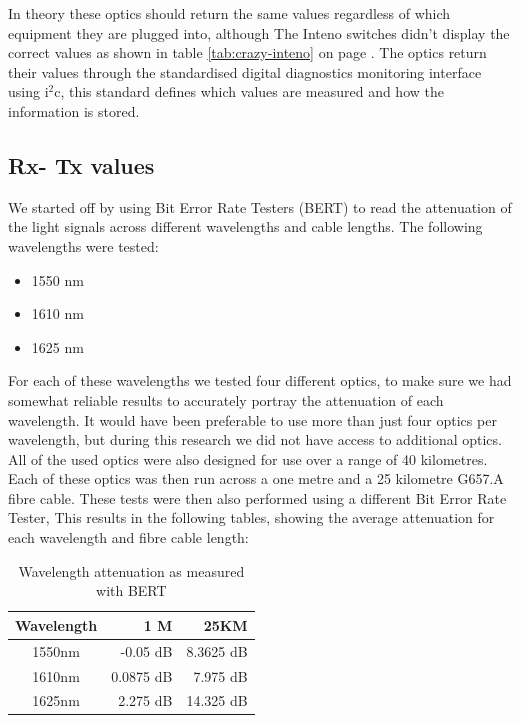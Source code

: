 \documentclass{article}
\begin{document}
In theory these optics should return the same values regardless of which equipment they are plugged into, although The Inteno switches didn't display the correct values as shown in table \ref{tab:crazy-inteno} on page \pageref{tab:crazy-inteno}.
The optics return their values through the standardised digital diagnostics monitoring interface using i$^2$c, this standard defines which values are measured and how the information is stored.\cite{SFF:DDM}


\subsection{Rx- Tx values}
We started off by using Bit Error Rate Testers (BERT) to read the attenuation of the light signals across different wavelengths and cable lengths.
The following wavelengths were tested:
\begin{itemize}
	\item 1550 nm
	\item 1610 nm
	\item 1625 nm
\end{itemize}

For each of these wavelengths we tested four different optics, to make sure we had somewhat reliable results to accurately portray the attenuation of each wavelength.
It would have been preferable to use more than just four optics per wavelength, but during this research we did not have access to additional optics.
All of the used optics were also designed for use over a range of 40 kilometres.
Each of these optics was then run across a one metre and a 25 kilometre G657.A fibre cable.
These tests were then also performed using a different Bit Error Rate Tester, 
This results in the following tables, showing the average attenuation for each wavelength and fibre cable length:

\begin{table}[h]
\centering
\label{tab:attenuation-table-ber}
\begin{tabular}{|c|r|r|}
\hline 
\textbf{Wavelength} & \textbf{1 M} & \textbf{25KM}\\ 
\hline 
1550nm & -0.05 dB & 8.3625 dB\\ 
\hline 
1610nm & 0.0875 dB & 7.975 dB\\ 
\hline 
1625nm & 2.275 dB & 14.325 dB\\
\hline
\end{tabular} 
\caption{Wavelength attenuation as measured with BERT}
\end{table}
\end{document}
